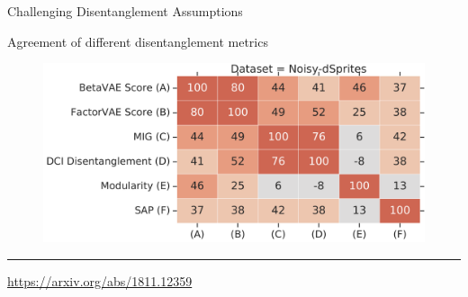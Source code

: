 \documentclass{beamer}
\begin{document}
\begin{frame}{Challenging Disentanglement Assumptions}
	\begin{block}{Agreement of different disentanglement metrics}
	\begin{figure}
		\centering
		\includegraphics[width=0.9\linewidth]{figs/challenge_dis_3}
	\end{figure}
	\vspace{0.5cm}
	\end{block}
	\vfill
	\hrule\medskip
	{\scriptsize \href{https://arxiv.org/abs/1811.12359}{https://arxiv.org/abs/1811.12359}}
\end{frame}
\end{document}

